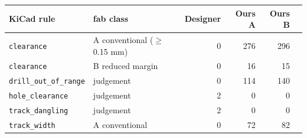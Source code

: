 \begin{tabular}{llrrrr}
\toprule
KiCad rule & fab class & Designer & Ours A & Ours B \\
\midrule
\texttt{clearance} & A conventional ($\geq$ 0.15 mm) & 0 & 276 & 296 \\
\texttt{clearance} & B reduced margin & 0 & 16 & 15 \\
\texttt{drill\_out\_of\_range} & judgement & 0 & 114 & 140 \\
\texttt{hole\_clearance} & judgement & 2 & 0 & 0 \\
\texttt{track\_dangling} & judgement & 2 & 0 & 0 \\
\texttt{track\_width} & A conventional & 0 & 72 & 82 \\
\bottomrule
\end{tabular}
